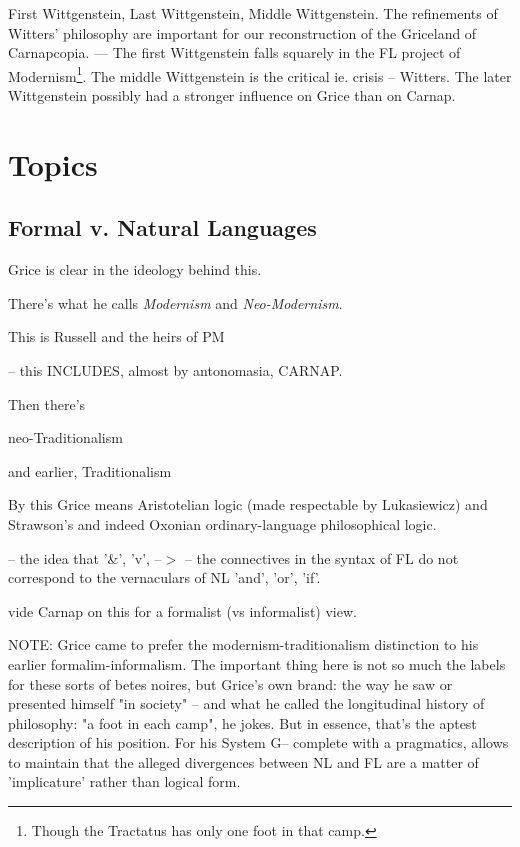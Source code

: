 \documentclass[10pt,titlepage]{book}
\begin{document}
First Wittgenstein, Last Wittgenstein, Middle Wittgenstein. The 
refinements of  Witters' philosophy are important for our reconstruction of the Griceland of Carnapcopia.
--- The first Wittgenstein falls squarely in the FL project of Modernism\footnote{Though the Tractatus has only one foot in that camp.}.
The middle Wittgenstein is the critical ie. crisis -- Witters.
The later Wittgenstein possibly had  a stronger influence on Grice 
than on  Carnap.

\chapter{Topics}

\section{Formal v. Natural Languages}
 
Grice is clear in the ideology behind this.
 
There's what he calls {\it Modernism} and {\it Neo-Modernism}.
 
This is Russell and the heirs of PM
 
  -- this INCLUDES, almost by antonomasia, CARNAP.
 
 
Then there's
 
  neo-Traditionalism
 
  and earlier, Traditionalism
 
  By this Grice means Aristotelian logic (made respectable by  Lukasiewicz)
  and Strawson's and indeed Oxonian ordinary-language philosophical  logic.
 
  -- the idea that '\&', 'v', --$>$ -- the connectives in the  syntax of FL
  do not correspond to the vernaculars of NL 'and', 'or', 'if'.
 
  vide Carnap on this for a formalist (vs informalist) view.
  

NOTE: Grice came to prefer the modernism-traditionalism  distinction to his 
earlier formalim-informalism. The important thing here is not  so much the 
labels for these sorts of betes noires, but Grice's own brand: the  way he 
saw or presented himself "in society" -- and what he called the  longitudinal 
history of philosophy: "a foot in each camp", he jokes. But in  essence, 
that's the aptest description of his position. For his System G--  complete 
with a pragmatics, allows to maintain that the alleged divergences  between 
NL and FL are a matter of 'implicature' rather than logical form. 
 
\end{document}
